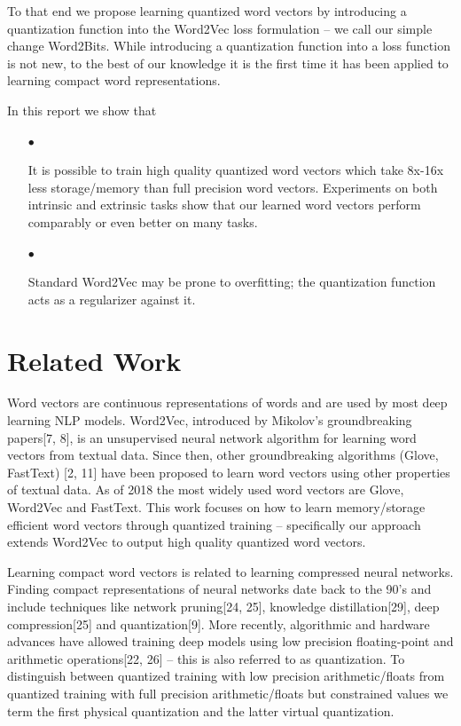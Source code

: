 \documentclass{article} %
\begin{document}
To that end we propose learning quantized word vectors by introducing
a quantization function into the Word2Vec loss formulation -- we call
our simple change Word2Bits. While introducing a quantization function
into a loss function is not new, to the best of our knowledge it is
the first time it has been applied to learning compact word representations.

In this report we show that
\begin{enumerate}
\item[$\bullet$]

  It is possible to train high quality quantized word vectors which
  take 8x-16x less storage/memory than full precision word
  vectors. Experiments on both intrinsic and extrinsic tasks show that
  our learned word vectors perform comparably or even better on many tasks.

\item[$\bullet$]

  Standard Word2Vec may be prone to overfitting; the quantization
  function acts as a regularizer against it.

\end{enumerate}

\section{Related Work}
Word vectors are continuous representations of words and are used by
most deep learning NLP models. Word2Vec, introduced by Mikolov's
groundbreaking papers[7, 8], is an unsupervised neural network algorithm for
learning word vectors from textual data. Since then, other
groundbreaking algorithms (Glove, FastText) [2, 11] have been proposed to
learn word vectors using other properties of textual data. As of 2018
the most widely used word vectors are Glove, Word2Vec and
FastText. This work focuses on how to learn memory/storage efficient
word vectors through quantized training -- specifically our approach
extends Word2Vec to output high quality quantized word vectors.

Learning compact word vectors is related to learning compressed neural
networks. Finding compact representations of neural
networks date back to the 90's and include techniques like network
pruning[24, 25], knowledge distillation[29], deep compression[25] and
quantization[9]. More recently, algorithmic and hardware advances have
allowed training deep models using low precision floating-point and
arithmetic operations[22, 26] -- this is also referred to as
quantization. To distinguish between quantized training with low
precision arithmetic/floats from quantized training with full
precision arithmetic/floats but constrained values we term the first
physical quantization and the latter virtual quantization.
\end{document}
